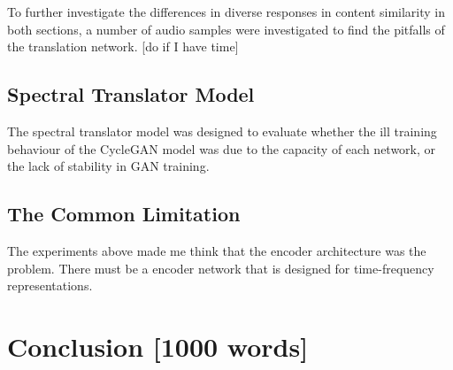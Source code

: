 \documentclass[12pt,a4paper,]{report}
\begin{document}
To further investigate the differences in diverse responses in content
similarity in both sections, a number of audio samples were investigated
to find the pitfalls of the translation network. {[}do if I have time{]}

\hypertarget{spectral-translator-model}{%
\section{Spectral Translator Model}\label{spectral-translator-model}}

The spectral translator model was designed to evaluate whether the ill
training behaviour of the CycleGAN model was due to the capacity of each
network, or the lack of stability in GAN training.

\hypertarget{the-common-limitation}{%
\section{The Common Limitation}\label{the-common-limitation}}

The experiments above made me think that the encoder architecture was
the problem. There must be a encoder network that is designed for
time-frequency representations.

\hypertarget{conclusion-1000-words}{%
\chapter{Conclusion {[}1000 words{]}}\label{conclusion-1000-words}}
\end{document}
